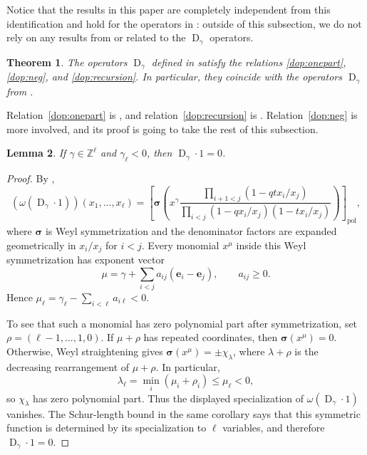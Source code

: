\documentclass[reqno]{amsart}
\theoremstyle{plain}
\newtheorem{theorem}{Theorem}[section]
\newtheorem{lemma}[theorem]{Lemma}
\theoremstyle{definition}
\theoremstyle{remark}
\DeclareMathOperator{\D}{D}
\newcommand{\Z}{\mathbb{Z}}
\newcommand{\<}{\langle}
\renewcommand{\>}{\rangle}
\begin{document}
Notice that the results in this paper are completely independent from this identification and hold for the operators in : outside of this subsection, we do not rely on any results from \cite{BHMPS2023ShuffleAnyLine} or \cite{Negut2014ShuffleAlgebra} related to the $\D_\gamma$ operators.

\begin{theorem}
    \label{thm:same-operators}
    The operators $\D_\gamma$ defined in \cite[Equation~(52)]{BHMPS2023ShuffleAnyLine} satisfy the relations \eqref{dop:onepart}, \eqref{dop:neg}, and \eqref{dop:recursion}.
    In particular, they coincide with the operators $\D_\gamma$ from .
\end{theorem}

Relation~\eqref{dop:onepart} is \cite[Proposition~3.3.4]{BHMPS2023ShuffleAnyLine}, and relation~\eqref{dop:recursion} is \cite[Equation~(47)]{BHMPS2023ProofExtendedDelta}. Relation~\eqref{dop:neg} is more involved, and its proof is going to take the rest of this subsection.

\begin{lemma}
    \label{lem:on-one}
    If $\gamma \in \Z^\ell$ and $\gamma_\ell<0$, then $\D_{\gamma} \cdot 1 = 0$.
\end{lemma}

\begin{proof}
    By \cite[Corollary~3.7.2 and Equation~(46)]{BHMPS2023ShuffleAnyLine},
    \[
        (\omega(\D_\gamma\cdot 1))(x_1,\dots,x_\ell)
        =\left[\boldsymbol{\sigma}\left(
        x^\gamma\frac{\prod_{i+1<j}(1-qt x_i/x_j)}
        {\prod_{i<j}(1-q x_i/x_j)(1-t x_i/x_j)}
        \right)\right]_{\mathrm{pol}},
    \]
    where $\boldsymbol{\sigma}$ is Weyl symmetrization and the denominator factors are expanded geometrically in $x_i/x_j$ for $i<j$. Every monomial $x^\mu$ inside this Weyl symmetrization has exponent vector
    \[ \mu=\gamma+\sum_{i<j} a_{ij}(\mathbf e_i-\mathbf e_j),\qquad a_{ij}\geq 0. \]
    Hence $\mu_\ell=\gamma_\ell-\sum_{i<\ell}a_{i\ell}<0$.

    To see that such a monomial has zero polynomial part after symmetrization, set $\rho=(\ell-1,\dots,1,0)$. If $\mu+\rho$ has repeated coordinates, then $\boldsymbol{\sigma}(x^\mu)=0$. Otherwise, Weyl straightening gives $\boldsymbol{\sigma}(x^\mu)=\pm\chi_\lambda$, where $\lambda+\rho$ is the decreasing rearrangement of $\mu+\rho$. In particular,
    \[ \lambda_\ell=\min_i(\mu_i+\rho_i)\leq\mu_\ell<0, \]
    so $\chi_\lambda$ has zero polynomial part. Thus the displayed specialization of $\omega(\D_\gamma\cdot 1)$ vanishes. The Schur-length bound in the same corollary says that this symmetric function is determined by its specialization to $\ell$ variables, and therefore $\D_\gamma\cdot 1=0$.
\end{proof}
\end{document}
